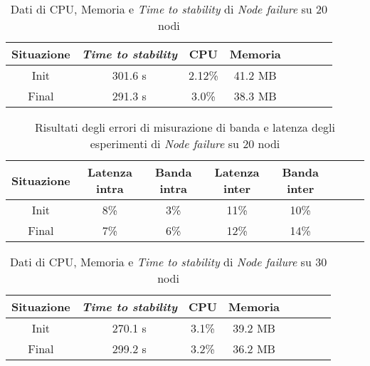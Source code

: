         \begin{table}[H]
            \caption{Dati di CPU, Memoria e \textit{Time to stability} di \textit{Node failure} su 20 nodi}
            \label{tab:nodefail20}
            \begin{center}
                \begin{tabular}{|c|c|c|c|c|c|c|c|}
                      \hline
                    Situazione & \textit{Time to stability} & CPU & Memoria\\
                    \hline
                    Init & 301.6 s & 2.12\% & 41.2 MB\\
                    \hline
                    Final & 291.3 s  & 3.0\% & 38.3 MB\\
                    \hline
                \end{tabular}
            \end{center}
        \end{table}
        
        \begin{table}[H]
            \caption{Risultati degli errori di misurazione di banda e latenza degli esperimenti di \textit{Node failure} su 20 nodi}
            \label{tab:nodefail20qos}
            \begin{center}
                \begin{tabular}{|c|c|c|c|c|c|c|c|}
                    \hline
                    Situazione & Latenza intra & Banda intra & Latenza inter & Banda inter\\
                    \hline
                    Init & 8\% &  3\%  & 11\% &  10\%\\
                    \hline
                    Final & 7\% &  6\%  &  12\% &  14\%\\
                    \hline
                \end{tabular}
            \end{center}
        \end{table}
        
        \begin{table}[H]
            \caption{Dati di CPU, Memoria e \textit{Time to stability} di \textit{Node failure} su 30 nodi}
            \label{tab:nodefail30}
            \begin{center}
                \begin{tabular}{|c|c|c|c|c|c|c|c|}
                     \hline
                    Situazione & \textit{Time to stability} & CPU & Memoria\\
                    \hline
                    Init & 270.1 s & 3.1\% & 39.2 MB\\
                    \hline
                    Final & 299.2 s  & 3.2\% & 36.2 MB\\
                    \hline
                \end{tabular}
            \end{center}
        \end{table}
        
